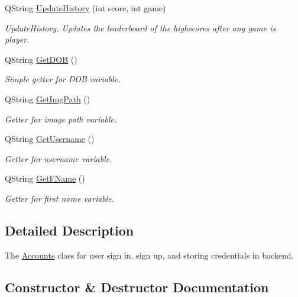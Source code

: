 \begin{DoxyCompactItemize}
Q\+String \hyperlink{classAccounts_a8a2edd82ca79c9c05341296e86c2a972}{Update\+History} (int score, int game)
\begin{DoxyCompactList}\small\item\em Update\+History. Updates the leaderboard of the highscores after any game is player. \end{DoxyCompactList}\item 
Q\+String \hyperlink{classAccounts_add43226d678648809eae2c7b11d3692b}{Get\+D\+OB} ()
\begin{DoxyCompactList}\small\item\em Simple getter for D\+OB variable. \end{DoxyCompactList}\item 
Q\+String \hyperlink{classAccounts_ad9cac5e9a586f525939b120070cbdc2d}{Get\+Img\+Path} ()
\begin{DoxyCompactList}\small\item\em Getter for image path variable. \end{DoxyCompactList}\item 
Q\+String \hyperlink{classAccounts_aa5d96a34d4281ce65a473b761ad9515a}{Get\+Username} ()
\begin{DoxyCompactList}\small\item\em Getter for username variable. \end{DoxyCompactList}\item 
Q\+String \hyperlink{classAccounts_a264f663ad2a101cdbfbf12d083ee86b5}{Get\+F\+Name} ()
\begin{DoxyCompactList}\small\item\em Getter for first name variable. \end{DoxyCompactList}\end{DoxyCompactItemize}


\subsection{Detailed Description}
The \hyperlink{classAccounts}{Accounts} class for user sign in, sign up, and storing credentials in backend. 

\subsection{Constructor \& Destructor Documentation}
\mbox{\label{classAccounts_ad1526db68d755eeac36773b25ce2fb5c}} 
